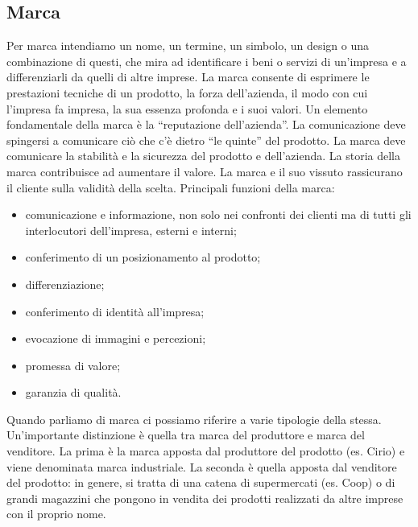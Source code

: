 \subsection{Marca}
Per marca intendiamo un nome, un termine, un simbolo, un design o una combinazione di questi, che mira ad identificare i beni o servizi di un’impresa e a differenziarli da quelli di altre imprese.
La marca consente di esprimere le prestazioni tecniche di un prodotto, la forza dell’azienda, il modo con cui l’impresa fa impresa, la sua essenza profonda e i suoi valori. \newline
Un elemento fondamentale della marca è la “reputazione dell’azienda”. La comunicazione deve spingersi a comunicare ciò che c’è dietro “le quinte” del prodotto. \newline
La marca deve comunicare la stabilità e la sicurezza del prodotto e dell’azienda. \newline
La storia della marca contribuisce ad aumentare il valore. La marca e il suo vissuto rassicurano il cliente sulla validità della scelta. \newline
Principali funzioni della marca:
\begin{itemize}
	\item comunicazione e informazione, non solo nei confronti dei clienti ma di tutti gli interlocutori dell’impresa, esterni e interni;
	\item conferimento di un posizionamento al prodotto;
	\item differenziazione;
	\item conferimento di identità all’impresa;
	\item evocazione di immagini e percezioni;
	\item promessa di valore;
	\item garanzia di qualità.
\end{itemize}
Quando parliamo di marca ci possiamo riferire a varie tipologie della stessa. Un’importante distinzione è quella tra marca del produttore e marca del venditore. La prima è la marca apposta dal produttore del prodotto (es. Cirio) e viene denominata marca industriale. La seconda è quella apposta dal venditore del prodotto: in genere, si tratta di una catena di supermercati (es. Coop) o di grandi magazzini che pongono in vendita dei prodotti realizzati da altre imprese con il proprio nome.

